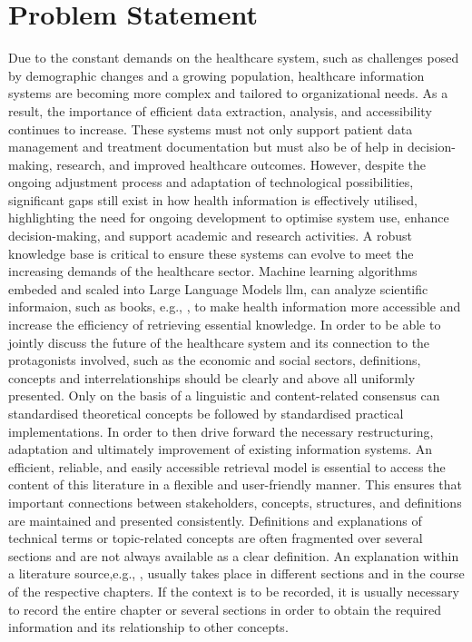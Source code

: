\section{Problem Statement}
Due to the constant demands on the healthcare system, such as challenges posed by demographic changes and a growing population, healthcare information systems are becoming more complex and tailored to organizational needs. 
As a result, the importance of efficient data extraction, analysis, and accessibility continues to increase. 
These systems must not only support patient data management and treatment documentation but must also be of help in decision-making, research, and improved healthcare outcomes. 
However, despite the ongoing adjustment process and adaptation of technological possibilities, significant gaps still exist in how health information is effectively utilised, highlighting the need for ongoing development to optimise system use, enhance decision-making, and support academic and research activities. 
A robust knowledge base is critical to ensure these systems can evolve to meet the increasing demands of the healthcare sector.
Machine learning algorithms embeded and scaled into Large Language Models \ac{llm}, can analyze scientific informaion, such as books, e.g., \citet{bb2}, to make health information more accessible and increase the efficiency of retrieving essential knowledge. 
In order to be able to jointly discuss the future of the healthcare system and its connection to the protagonists involved, such as the economic and social sectors, definitions, concepts and interrelationships should be clearly and above all uniformly presented. 
Only on the basis of a linguistic and content-related consensus can standardised theoretical concepts be followed by standardised practical implementations. 
In order to then drive forward the necessary restructuring, adaptation and ultimately improvement of existing information systems. 
An efficient, reliable, and easily accessible retrieval model is essential to access the content of this literature in a flexible and user-friendly manner. 
This ensures that important connections between stakeholders, concepts, structures, and definitions are maintained and presented consistently. 
Definitions and explanations of technical terms or topic-related concepts are often fragmented over several sections and are not always available as a clear definition. 
An explanation within a literature source,e.g., \citet{bb2}, usually takes place in different sections and in the course of the respective chapters.
If the context is to be recorded, it is usually necessary to record the entire chapter or several sections in order to obtain the required information and its relationship to other concepts. 
